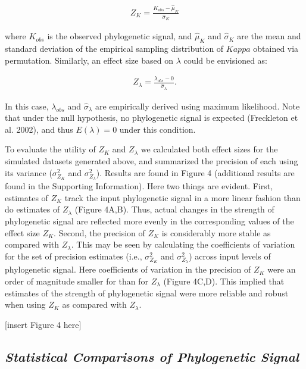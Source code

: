 \documentclass[
]{article}
\begin{document}
\begin{align}
    Z_{K}=\frac{K_{obs}-\hat\mu_K}{\hat\sigma_K}
\end{align}

where \(K_{obs}\) is the observed phylogenetic signal, and \(\hat\mu_K\)
and \(\hat\sigma_K\) are the mean and standard deviation of the
empirical sampling distribution of \(Kappa\) obtained via permutation.
Similarly, an effect size based on \(\lambda\) could be envisioned as:

\begin{align}
    Z_{\lambda}=\frac{\lambda_{obs}-0}{\hat\sigma_\lambda}.
\end{align}

In this case, \(\lambda_{obs}\) and \(\hat\sigma_\lambda\) are
empirically derived using maximum likelihood. Note that under the null
hypothesis, no phylogenetic signal is expected (Freckleton et al. 2002),
and thus \(E(\lambda)=0\) under this condition. \hfill\break

To evaluate the utility of \(Z_K\) and \(Z_\lambda\) we calculated both
effect sizes for the simulated datasets generated above, and summarized
the precision of each using its variance (\(\sigma^2_{Z_K}\) and
\(\sigma^2_{Z_\lambda}\)). Results are found in Figure 4 (additional
results are found in the Supporting Information). Here two things are
evident. First, estimates of \(Z_K\) track the input phylogenetic signal
in a more linear fashion than do estimates of \(Z_\lambda\) (Figure
4A,B). Thus, actual changes in the strength of phylogenetic signal are
reflected more evenly in the corresponding values of the effect size
\(Z_K\). Second, the precision of \(Z_K\) is considerably more stable as
compared with \(Z_\lambda\). This may be seen by calculating the
coefficients of variation for the set of precision estimates (i.e.,
\(\sigma^2_{Z_K}\) and \(\sigma^2_{Z_\lambda}\)) across input levels of
phylogenetic signal. Here coefficients of variation in the precision of
\(Z_K\) were an order of magnitude smaller for than for \(Z_\lambda\)
(Figure 4C,D). This implied that estimates of the strength of
phylogenetic signal were more reliable and robust when using \(Z_K\) as
compared with \(Z_\lambda\). \hfill\break

{[}insert Figure 4 here{]}

\hypertarget{statistical-comparisons-of-phylogenetic-signal}{%
\subsection{\texorpdfstring{\emph{Statistical Comparisons of
Phylogenetic
Signal}}{Statistical Comparisons of Phylogenetic Signal}}\label{statistical-comparisons-of-phylogenetic-signal}}
\end{document}
